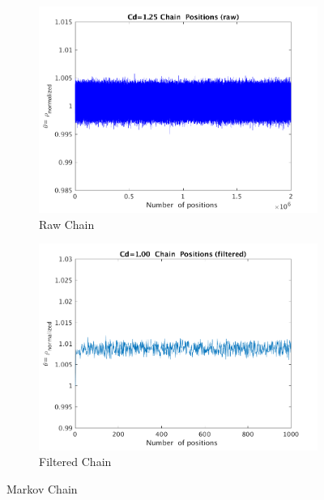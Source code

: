 \documentclass{article}
\begin{document}
\begin{figure}[H]
\captionsetup[subfigure]{justification=centering}
\begin{center}
  \begin{subfigure}{0.4\textwidth}
    \centering\includegraphics[width=1.1\textwidth,keepaspectratio]{images/inverse_problem/infer_radius/drag_125/range_short/density_samples_chain.png}
    \caption{\centering Raw Chain}
  \end{subfigure}
 \begin{subfigure}{0.4\textwidth}
    \centering\includegraphics[width=1.1\textwidth,keepaspectratio]{images/inverse_problem/infer_radius/drag_01/density_samples_filtered.png}
    \caption{\centering Filtered Chain}
  \end{subfigure}


\caption{Markov Chain}
\label{fig:chain} 
 \end{center}
\end{figure}
\end{document}
